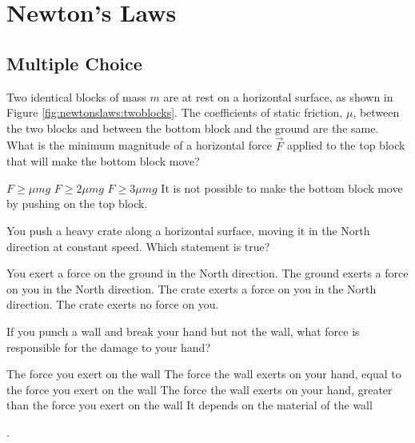 \section{Newton's Laws}


\subsection{Multiple Choice}

\question[1] \label{question:newtonslaws:twoblocks} Two identical blocks of mass $m$ are at rest on a horizontal surface, as shown in Figure \ref{fig:newtonslaws:twoblocks}. The coefficients of static friction, $\mu$, between the two blocks and between the bottom block and the ground are the same. What is the minimum magnitude of a horizontal force $\vec F$ applied to the top block that will make the bottom block move?
\begin{choices} 
	\choice $F \geq \mu mg$
	\choice $F \geq 2\mu mg$
	\choice $F \geq 3\mu mg$
	\CorrectChoice It is not possible to make the bottom block move by pushing on the top block.
\end{choices}


\question You push a heavy crate along a horizontal surface, moving it in the North direction at constant speed. Which statement is true?
\begin{checkboxes} 
	\choice You exert a force on the ground in the North direction.
	\CorrectChoice The ground exerts a force on you in the North direction.
	\choice The crate exerts a force on you in the North direction.
	\choice The crate exerts no force on you.
\end{checkboxes}

\question If you punch a wall and break your hand but not the wall, what force is responsible for the damage to your hand?
\begin{checkboxes}
\choice The force you exert on the wall
\CorrectChoice The force the wall exerts on your hand, equal to the force you exert on the wall \correct
\choice The force the wall exerts on your hand, greater than the force you exert on the wall
\choice It depends on the material of the wall
\end{checkboxes}.

